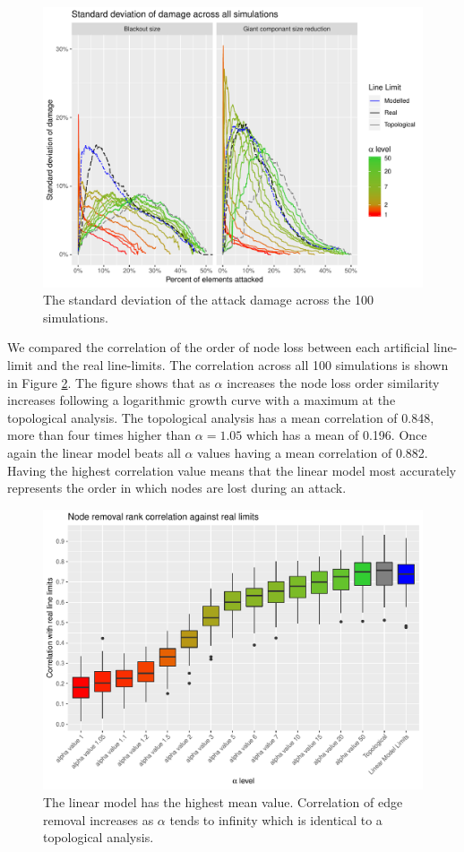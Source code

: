 \documentclass{article}
\begin{document}
\begin{figure}
    \centering
    \includegraphics{Figures/SDchange.pdf}
    \caption{The standard deviation of the attack damage across the 100 simulations.}
    \label{fig:SDDamage}
\end{figure}

We compared the correlation of the order of node loss between each artificial line-limit and the real line-limits. The correlation across all 100 simulations is shown in Figure \ref{fig:DamCor}. The figure shows that as $\alpha$ increases the node loss order similarity increases following a logarithmic growth curve with a maximum at the topological analysis. The topological analysis has a mean correlation of 0.848, more than four times higher than $\alpha = 1.05$ which has a mean of 0.196. Once again the linear model beats all $\alpha$ values having a mean correlation of 0.882. Having the highest correlation value means that the linear model most accurately represents the order in which nodes are lost during an attack.

\begin{figure}
    \centering
    \includegraphics{Figures/CorBoxPlot.pdf}
    \caption{The linear model has the highest mean value. Correlation of edge removal increases as $\alpha$ tends to infinity which is identical to a topological analysis.}
    \label{fig:DamCor}
\end{figure}
\end{document}
